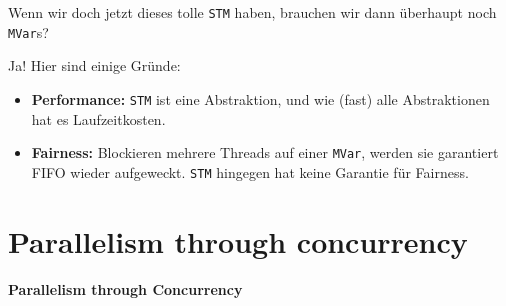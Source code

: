 \documentclass{beamer}
\begin{document}

\begin{frame}
Wenn wir doch jetzt dieses tolle \texttt{STM} haben, brauchen wir dann überhaupt noch \texttt{MVar}s?\pause\bigskip

Ja! Hier sind einige Gründe:\pause
\begin{itemize}
\item \textbf{Performance:} \texttt{STM} ist eine Abstraktion, und wie (fast) alle Abstraktionen hat es Laufzeitkosten.\pause
\item \textbf{Fairness:} Blockieren mehrere Threads auf einer \texttt{MVar}, werden sie garantiert FIFO wieder aufgeweckt. \texttt{STM} hingegen hat keine Garantie für Fairness.
\end{itemize} 
\end{frame}


\section{Parallelism through concurrency}

\begin{frame}

\begin{center}
\Large
\textbf{Parallelism through Concurrency}
\end{center}

\end{frame}
\end{document}
